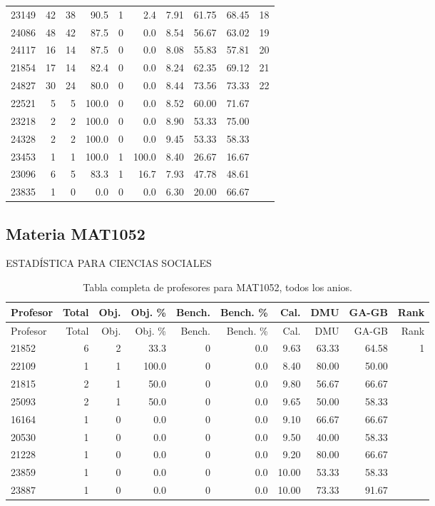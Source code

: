 \begin{longtable}{lrrrrrrrrr}
23149 & 42 & 38 & 90.5 & 1 & 2.4 & 7.91 & 61.75 & 68.45 & 18 \\
24086 & 48 & 42 & 87.5 & 0 & 0.0 & 8.54 & 56.67 & 63.02 & 19 \\
24117 & 16 & 14 & 87.5 & 0 & 0.0 & 8.08 & 55.83 & 57.81 & 20 \\
21854 & 17 & 14 & 82.4 & 0 & 0.0 & 8.24 & 62.35 & 69.12 & 21 \\
24827 & 30 & 24 & 80.0 & 0 & 0.0 & 8.44 & 73.56 & 73.33 & 22 \\
22521 & 5 & 5 & 100.0 & 0 & 0.0 & 8.52 & 60.00 & 71.67 &  \\
23218 & 2 & 2 & 100.0 & 0 & 0.0 & 8.90 & 53.33 & 75.00 &  \\
24328 & 2 & 2 & 100.0 & 0 & 0.0 & 9.45 & 53.33 & 58.33 &  \\
23453 & 1 & 1 & 100.0 & 1 & 100.0 & 8.40 & 26.67 & 16.67 &  \\
23096 & 6 & 5 & 83.3 & 1 & 16.7 & 7.93 & 47.78 & 48.61 &  \\
23835 & 1 & 0 & 0.0 & 0 & 0.0 & 6.30 & 20.00 & 66.67 &  \\
\bottomrule
\end{longtable}
\endgroup

\subsection{Materia MAT1052}

ESTADÍSTICA PARA CIENCIAS SOCIALES

\begingroup
\scriptsize
\setlength{\tabcolsep}{3pt}
\begin{longtable}{lrrrrrrrrr}
\caption{Tabla completa de profesores para MAT1052, todos los anios.}\label{tab:prof-global-mat1052}\\
\toprule
Profesor & Total & Obj. & Obj. \% & Bench. & Bench. \% & Cal. & DMU & GA-GB & Rank \\
\midrule
\endfirsthead
\toprule
Profesor & Total & Obj. & Obj. \% & Bench. & Bench. \% & Cal. & DMU & GA-GB & Rank \\
\midrule
\endhead
21852 & 6 & 2 & 33.3 & 0 & 0.0 & 9.63 & 63.33 & 64.58 & 1 \\
22109 & 1 & 1 & 100.0 & 0 & 0.0 & 8.40 & 80.00 & 50.00 &  \\
21815 & 2 & 1 & 50.0 & 0 & 0.0 & 9.80 & 56.67 & 66.67 &  \\
25093 & 2 & 1 & 50.0 & 0 & 0.0 & 9.65 & 50.00 & 58.33 &  \\
16164 & 1 & 0 & 0.0 & 0 & 0.0 & 9.10 & 66.67 & 66.67 &  \\
20530 & 1 & 0 & 0.0 & 0 & 0.0 & 9.50 & 40.00 & 58.33 &  \\
21228 & 1 & 0 & 0.0 & 0 & 0.0 & 9.20 & 80.00 & 66.67 &  \\
23859 & 1 & 0 & 0.0 & 0 & 0.0 & 10.00 & 53.33 & 58.33 &  \\
23887 & 1 & 0 & 0.0 & 0 & 0.0 & 10.00 & 73.33 & 91.67 &  \\
\bottomrule
\end{longtable}
\endgroup

